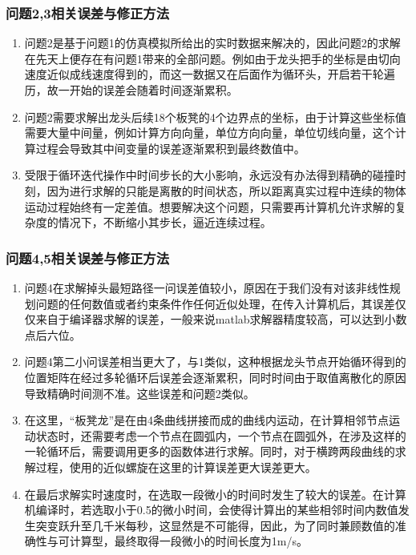 \documentclass{cumcmthesis1}
\begin{document}
\subsubsection{问题2,3相关误差与修正方法}
\begin{enumerate}
    \item 问题2是基于问题1的仿真模拟所给出的实时数据来解决的，因此问题2的求解在先天上便存在有问题1带来的全部问题。例如由于龙头把手的坐标是由切向速度近似成线速度得到的，而这一数据又在后面作为循环头，开启若干轮遍历，故一开始的误差会随着时间逐渐累积。
    \item 问题2需要求解出龙头后续18个板凳的4个边界点的坐标，由于计算这些坐标值需要大量中间量，例如计算方向向量，单位方向向量，单位切线向量，这个计算过程会导致其中间变量的误差逐渐累积到最终数值中。
    \item 受限于循环迭代操作中时间步长的大小影响，永远没有办法得到精确的碰撞时刻，因为进行求解的只能是离散的时间状态，所以距离真实过程中连续的物体运动过程始终有一定差值。想要解决这个问题，只需要再计算机允许求解的复杂度的情况下，不断缩小其步长，逼近连续过程。
    \end{enumerate}
\subsubsection{问题4,5相关误差与修正方法}
\begin{enumerate}
    \item 问题4在求解掉头最短路径一问误差值较小，原因在于我们没有对该非线性规划问题的任何数值或者约束条件作任何近似处理，在传入计算机后，其误差仅仅来自于编译器求解的误差，一般来说matlab求解器精度较高，可以达到小数点后六位。
    \item 问题4第二小问误差相当更大了，与1类似，这种根据龙头节点开始循环得到的位置矩阵在经过多轮循环后误差会逐渐累积，同时时间由于取值离散化的原因导致精确时间测不准。这些误差和问题2类似。
    \item 在这里，“板凳龙”是在由4条曲线拼接而成的曲线内运动，在计算相邻节点运动状态时，还需要考虑一个节点在圆弧内，一个节点在圆弧外，在涉及这样的一轮循环后，需要调用更多的函数体进行求解。同时，对于横跨两段曲线的求解过程，使用的近似螺旋在这里的计算误差更大误差更大。
    \item 在最后求解实时速度时，在选取一段微小的时间时发生了较大的误差。在计算机编译时，若选取小于0.5的微小时间，会使得计算出的某些相邻时间内数值发生突变跃升至几千米每秒，这显然是不可能得，因此，为了同时兼顾数值的准确性与可计算型，最终取得一段微小的时间长度为1m/s。
    \end{enumerate}
\end{document}

